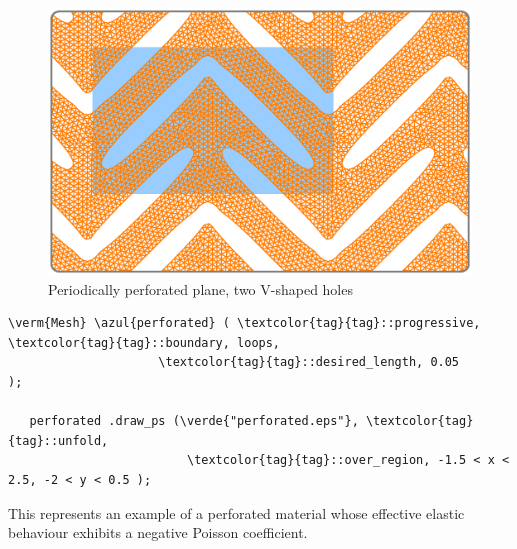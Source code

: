 \begin{figure}[ht] \centering
  \includegraphics[width=140mm]{boomerang-3.eps}
  \caption{Periodically perforated plane, two V-shaped holes}
  \label{\numb section 7.\numb fig 16}
\end{figure}

\begin{Verbatim}[commandchars=\\\{\},formatcom=\small\tt,frame=single,
   label=code not working,rulecolor=\color{coment},
   baselinestretch=0.94,framesep=2mm                                   ]
   \verm{Mesh} \azul{perforated} ( \textcolor{tag}{tag}::progressive, \textcolor{tag}{tag}::boundary, loops,
                     \textcolor{tag}{tag}::desired_length, 0.05              );

   perforated .draw_ps (\verde{"perforated.eps"}, \textcolor{tag}{tag}::unfold,
                         \textcolor{tag}{tag}::over_region, -1.5 < x < 2.5, -2 < y < 0.5 );
\end{Verbatim}

This represents an example of a perforated material whose effective elastic behaviour
exhibits a negative Poisson coefficient.
